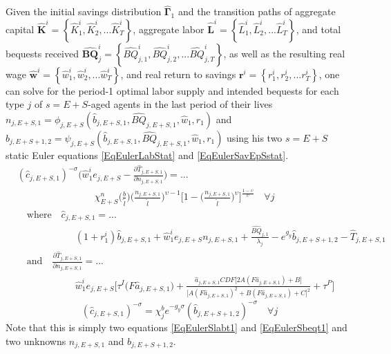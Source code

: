 \documentclass[letterpaper,12pt]{article}
\theoremstyle{definition}
\begin{document}
  Given the initial savings distribution $\bm{\hat{\Gamma}}_1$ and the transition paths of aggregate capital $\bm{\hat{K}}^i = \left\{\hat{K}_1^i,\hat{K}_2^i,...\hat{K}_T^i\right\}$, aggregate labor $\bm{\hat{L}}^i = \left\{\hat{L}_1^i,\hat{L}_2^i,...\hat{L}_T^i\right\}$, and total bequests received $\bm{\hat{BQ}}_j^i = \left\{\hat{BQ}_{j,1}^i,\hat{BQ}_{j,2}^i,...\hat{BQ}_{j,T}^i\right\}$, as well as the resulting real wage $\bm{\hat{w}}^i = \left\{\hat{w}_1^i,\hat{w}_2^i,...\hat{w}_T^i\right\}$, and real return to savings $\bm{r}^i = \left\{r_1^i,r_2^i,...r_T^i\right\}$, one can solve for the period-1 optimal labor supply and intended bequests for each type $j$ of $s=E+S$-aged agents in the last period of their lives $n_{j,E+S,1}=\phi_{j,E+S}(\hat{b}_{j,E+S,1},\hat{BQ}_{j,E+S,1},\hat{w}_1,r_1)$ and $\hat{b}_{j,E+S+1,2}=\psi_{j,E+S}(\hat{b}_{j,E+S,1},\hat{BQ}_{j,E+S,1},\hat{w}_1,r_1)$ using his two $s=E+S$ static Euler equations \eqref{EqEulerLabStat} and \eqref{EqEulerSavEpSstat}.
  \begin{equation}\label{EqEulerSlabt1}
    \begin{split}
      &(\hat{c}_{j,E+S,1})^{-\sigma}\Biggl(\hat{w}_1^i e_{j,E+S} - \frac{\partial\hat{T}_{j,E+S,1}}{\partial n_{j,E+S,1}}\Biggr) = ... \\
      &\qquad\qquad\qquad\qquad \chi^n_{E+S}\biggl(\frac{b}{\tilde{l}}\biggr)\biggl(\frac{n_{j,E+S,1}}{\tilde{l}}\biggr)^{\upsilon-1}\Biggl[1 - \biggl(\frac{n_{j,E+S,1}}{\tilde{l}}\biggr)^\upsilon\Biggr]^{\frac{1-\upsilon}{\upsilon}} \quad\forall j \\
      &\quad\text{where}\quad \hat{c}_{j,E+S,1} = ... \\
      &\qquad\qquad\qquad \left(1 + r_1^i\right)\hat{b}_{j,E+S,1} + \hat{w}_1^i e_{j,E+S}n_{j,E+S,1} + \frac{\hat{BQ}_{j,1}}{\lambda_j} - e^{g_y}\hat{b}_{j,E+S+1,2} - \hat{T}_{j,E+S,1} \\
      &\quad\text{and}\quad \frac{\partial \hat{T}_{j,E+S,1}}{\partial n_{j,E+S,1}} = ... \\
      &\qquad\qquad\qquad \hat{w}_1^i e_{j,E+S}\biggl[\tau^I\bigl(F\hat{a}_{j,E+S,1}\bigr) + \frac{\hat{a}_{j,E+S,1}CDF\bigl[2A(F\hat{a}_{j,E+S,1})+B\bigr]}{\bigl[A(F\hat{a}_{j,E+S,1})^2+B(F \hat{a}_{j,E+S,1})+C\bigr]^2} + \tau^P\Biggr]
    \end{split}
  \end{equation}
  \begin{equation}\label{EqEulerSbeqt1}
    (\hat{c}_{j,E+S,1})^{-\sigma} = \chi^b_j e^{-g_y\sigma}(\hat{b}_{j,E+S+1,2})^{-\sigma} \quad\forall j
  \end{equation}
  Note that this is simply two equations \eqref{EqEulerSlabt1} and \eqref{EqEulerSbeqt1} and two unknowns $n_{j,E+S,1}$ and $\hat{b}_{j,E+S+1,2}$.
\end{document}
